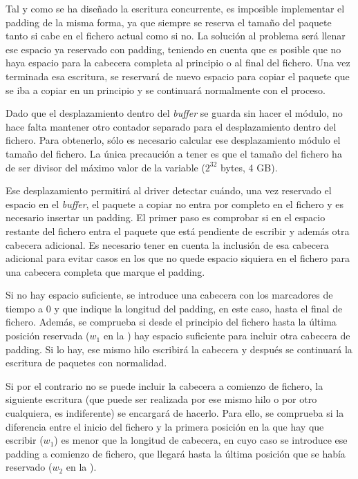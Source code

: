 \documentclass[oneside, draft]{epstfg}
\begin{document}
Tal y como se ha diseñado la escritura concurrente, es imposible implementar el \gls{padding} de la misma forma, ya que siempre se reserva el tamaño del paquete tanto si cabe en el fichero actual como si no. La solución al problema será llenar ese espacio ya reservado con \gls{padding}, teniendo en cuenta que es posible que no haya espacio para la cabecera completa al principio o al final del fichero. Una vez terminada esa escritura, se reservará de nuevo espacio para copiar el paquete que se iba a copiar en un principio y se continuará normalmente con el proceso.

Dado que el desplazamiento dentro del \textit{buffer} se guarda sin hacer el módulo, no hace falta mantener otro contador separado para el desplazamiento dentro del fichero. Para obtenerlo, sólo es necesario calcular ese desplazamiento módulo el tamaño del fichero. La única precaución a tener es que el tamaño del fichero ha de ser divisor del máximo valor de la variable ($2^{32}$ bytes, 4 GB).

Ese desplazamiento permitirá al \gls{driver} detectar cuándo, una vez reservado el espacio en el \textit{buffer}, el paquete a copiar no entra por completo en el fichero y es necesario insertar un \gls{padding}. El primer paso es comprobar si en el espacio restante del fichero entra el paquete que está pendiente de escribir y además otra cabecera adicional. Es necesario tener en cuenta la inclusión de esa cabecera adicional para evitar casos en los que no quede espacio siquiera en el fichero para una cabecera completa que marque el \gls{padding}.

Si no hay espacio suficiente, se introduce una cabecera con los marcadores de tiempo a 0 y que indique la longitud del \gls{padding}, en este caso, hasta el final de fichero. Además, se comprueba si desde el principio del fichero hasta la última posición reservada ($w_1$ en la ) hay espacio suficiente para incluir otra cabecera de \gls{padding}. Si lo hay, ese mismo hilo escribirá la cabecera y después se continuará la escritura de paquetes con normalidad.

Si por el contrario no se puede incluir la cabecera a comienzo de fichero, la siguiente escritura (que puede ser realizada por ese mismo hilo o por otro cualquiera, es indiferente) se encargará de hacerlo. Para ello, se comprueba si la diferencia entre el inicio del fichero y la primera posición en la que hay que escribir ($w_1$) es menor que la longitud de cabecera, en cuyo caso se introduce ese \gls{padding} a comienzo de fichero, que llegará hasta la última posición que se había reservado ($w_2$ en la ).
\end{document}
